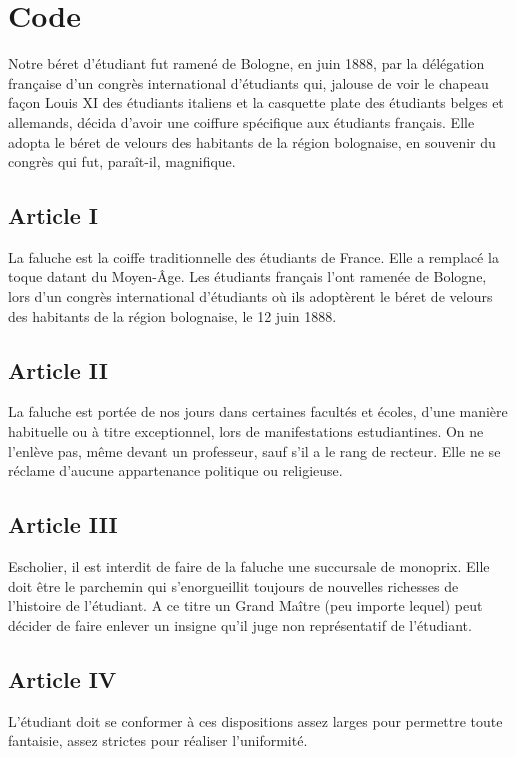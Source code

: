 \chapter*{Code}
         Notre béret d'étudiant fut ramené de Bologne, en juin 1888, par la délégation
française d'un congrès international d'étudiants qui, jalouse de voir le chapeau façon
Louis XI des étudiants italiens et la casquette plate des étudiants belges et allemands,
décida d'avoir une coiffure spécifique aux étudiants français. Elle adopta le béret de
velours des habitants de la région bolognaise, en souvenir du congrès qui fut, paraît-il,
magnifique.

\section{Article I}
        La faluche est la coiffe traditionnelle des étudiants de France. Elle a remplacé la
toque datant du Moyen-Âge. Les étudiants français l'ont ramenée de Bologne, lors d'un
congrès international d'étudiants où ils adoptèrent le béret de velours des habitants de la
région bolognaise, le 12 juin 1888.

\section{Article II}
         La faluche est portée de nos jours dans certaines facultés et écoles, d'une manière
habituelle ou à titre exceptionnel, lors de manifestations estudiantines. On ne l'enlève pas,
même devant un professeur, sauf s'il a le rang de recteur. Elle ne se réclame d'aucune
appartenance politique ou religieuse.

\section{Article III}
         Escholier, il est interdit de faire de la faluche une succursale de monoprix. Elle doit
être le parchemin qui s'enorgueillit toujours de nouvelles richesses de l'histoire de
l'étudiant.
         A ce titre un Grand Maître (peu importe lequel) peut décider de faire enlever un
insigne qu'il juge non représentatif de l'étudiant.

\section{Article IV}
          L'étudiant doit se conformer à ces dispositions assez larges pour permettre toute
fantaisie, assez strictes pour réaliser l'uniformité.


